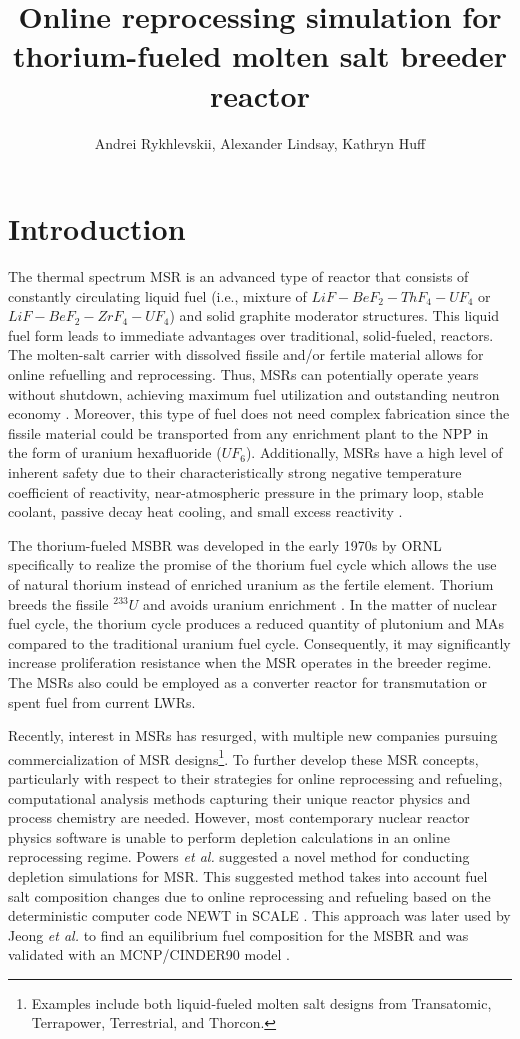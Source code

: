\documentclass{anstrans}
\title{Online reprocessing simulation for thorium-fueled molten salt breeder 
reactor}
\author{Andrei Rykhlevskii, Alexander Lindsay, Kathryn Huff}
\institute{
        Department of Nuclear, Plasma, and Radiological Engineering, University 
        of Illinois at Urbana-Champaign \break
        Urbana, IL
}
\begin{document}
\section{Introduction}
The thermal spectrum \gls{MSR} is an advanced type of reactor that consists of 
constantly circulating liquid fuel (i.e., mixture of $LiF-BeF_2-ThF_4-UF_4$ or 
$LiF-BeF_2-ZrF_4-UF_4$) and solid graphite moderator structures. This liquid 
fuel form leads to immediate advantages over traditional, 
solid-fueled, reactors. The molten-salt carrier with dissolved 
fissile and/or fertile material allows for online refuelling and 
reprocessing. Thus, \glspl{MSR} can potentially operate years without shutdown, 
achieving maximum fuel utilization and outstanding neutron economy 
\cite{leblanc_molten_2010}. Moreover, this type of fuel does not need 
complex fabrication since the fissile material could be transported from any 
enrichment plant to the \gls{NPP} in the form 
of uranium hexafluoride ($UF_6$).  Additionally, \glspl{MSR} have a high level 
of inherent safety due to their characteristically 
strong negative temperature coefficient of reactivity, near-atmospheric 
pressure in the primary loop, stable coolant, passive decay heat cooling, and 
small excess reactivity \cite{elsheikh_safety_2013}.

The thorium-fueled \gls{MSBR} was developed in the early 1970s by \gls{ORNL} 
specifically to realize the promise of the thorium fuel cycle which allows the 
use of natural thorium instead of enriched uranium as the fertile element. 
Thorium breeds the fissile $^{233}U$ and avoids uranium enrichment 
\cite{robertson_conceptual_1971}. In the matter of nuclear fuel cycle, the 
thorium cycle produces a reduced quantity of plutonium and \glspl{MA} 
compared to the traditional uranium fuel cycle. Consequently, it may 
significantly increase proliferation resistance when the \gls{MSR} operates in the 
breeder regime. The \glspl{MSR} also could be employed as a converter reactor for 
transmutation or spent fuel from current \glspl{LWR}.

Recently, interest in \glspl{MSR} has resurged, with multiple new companies 
pursuing commercialization of \gls{MSR} designs\footnote{Examples include both 
liquid-fueled molten salt designs from Transatomic, Terrapower, Terrestrial, 
and Thorcon.}.
To further develop these \gls{MSR} concepts, particularly with respect to their  
strategies for online reprocessing and refueling, computational analysis methods capturing
their unique reactor physics and process chemistry are needed.
However, most contemporary nuclear reactor physics software is unable to 
perform depletion calculations in an online reprocessing 
regime. Powers \emph{et al.} suggested a novel method for conducting 
depletion simulations for \gls{MSR}. This suggested method takes into account 
fuel salt composition changes due to online 
reprocessing and refueling based on the deterministic computer code NEWT in 
SCALE \cite{powers_new_2013}. This approach was later used by Jeong \emph{et 
al.} to find an equilibrium fuel composition for the \gls{MSBR} and was 
validated with an \gls{MCNP}/CINDER90 model \cite{jeong_equilibrium_2016}. 
\end{document}
